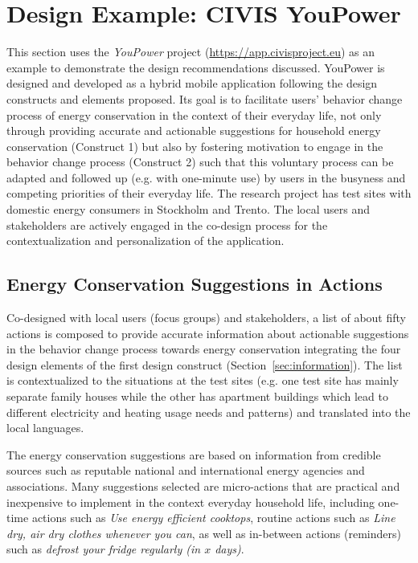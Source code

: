 \documentclass[a4paper]{article}
\begin{document}
\section{Design Example: CIVIS YouPower} 
\label{sec:example}

This section uses the \textit{YouPower} project (\url{https://app.civisproject.eu}) as an example to demonstrate the design recommendations discussed. YouPower is designed and developed as a hybrid mobile application following the design constructs and elements proposed. Its goal is to facilitate users' behavior change process of energy conservation in the context of their everyday life, not only through providing accurate and actionable suggestions for household energy conservation (Construct 1) but also by fostering motivation to engage in the behavior change process (Construct 2) such that this voluntary process can be adapted and followed up (e.g. with one-minute use) by users in the busyness and competing priorities of their everyday life. The research project has test sites with domestic energy consumers in Stockholm and Trento. The local users and stakeholders are actively engaged in the co-design process for the contextualization and personalization of the application. 


\subsection{Energy Conservation Suggestions in Actions} 
\label{sec:example:suggestions}

Co-designed with local users (focus groups) and stakeholders, a list of about fifty actions is composed to provide accurate information about actionable suggestions in the behavior change process towards energy conservation integrating the four design elements of the first design construct (Section~\ref{sec:information}). The list is contextualized to the situations at the test sites (e.g. one test site has mainly separate family houses while the other has apartment buildings which lead to different electricity and heating usage needs and patterns) and translated into the local languages. 

The energy conservation suggestions are based on information from credible sources such as reputable national and international energy agencies and associations. Many suggestions selected are micro-actions that are practical and inexpensive to implement in the context everyday household life, including one-time actions such as \textit{Use energy efficient cooktops}, routine actions such as \textit{Line dry, air dry clothes whenever you can}, as well as in-between actions (reminders) such as \textit{defrost your fridge regularly (in $x$ days)}. 
\end{document}
